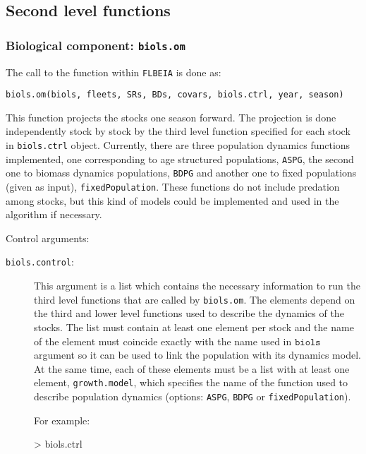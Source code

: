 
\subsection{Second level functions} \label{sec:2ndlvl}

	\subsubsection{Biological component: \texttt{biols.om}}
	
	The call to the function within \texttt{FLBEIA} is done as:
	
	\begin{center}
		\texttt{biols.om(biols, fleets, SRs, BDs, covars, biols.ctrl, year, season)}
	\end{center}
		
		This function projects the stocks one season forward. The projection is done independently stock by stock by the third level function specified for each stock in \texttt{biols.ctrl} object. Currently, there are three population dynamics functions implemented, one corresponding to age structured populations, \texttt{ASPG}, the second one to biomass dynamics populations, \texttt{BDPG} and another one to fixed populations (given as input), \texttt{fixedPopulation}. These functions do not include predation among stocks, but this kind of models could be implemented and used in the algorithm if necessary.

  \noindent Control arguments:
  \begin{description}
    \item[\texttt{biols.control}:] This argument is a list which contains the necessary information to run the third level functions that are called by \texttt{biols.om}. The elements depend on the third and lower level functions used to describe the 	dynamics of the stocks. The list must contain at least one element per stock and the name of the element must coincide exactly with the name used in $\texttt{biols}$ argument so it can be used to link the population with its dynamics model. At the same time, each of these elements must be a list with at least one element, \texttt{growth.model}, which specifies the name of the function used to describe population dynamics (options: \texttt{ASPG}, \texttt{BDPG} or \texttt{fixedPopulation}).
    
  	For example:
       
    \begin{Schunk}
      \begin{Sinput}
        > biols.ctrl
      \end{Sinput}
      
    \end{Schunk}
  \end{description}

